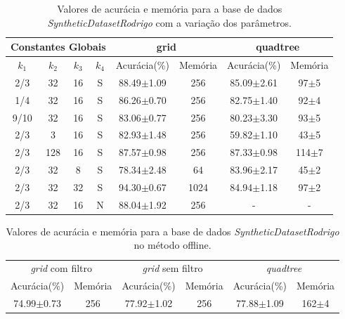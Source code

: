 \documentclass[conference]{IEEEtran}
\begin{document}
\begin{table}[h]
\caption{Valores de acurácia e memória para a base de dados \textit{SyntheticDatasetRodrigo} com a variação dos parâmetros.}
\tabcolsep=0.12cm
\begin{center}
\begin{tabular}{@{}cccccccc@{}}
\hline
\multicolumn{4}{c}{Constantes Globais} & \multicolumn{2}{c}{grid} & \multicolumn{2}{c}{quadtree} \\ \hline
$k_{1}$ & $k_{2}$ & $k_{3}$ & $k_{4}$ & Acurácia(\%) & Memória & Acurácia(\%) & Memória \\ \hline
2/3 & 32 & 16 & S & 88.49$\pm$1.09 & 256 & 85.09$\pm$2.61 & 97$\pm$5 \\
1/4 & 32 & 16 & S & 86.26$\pm$0.70 & 256 & 82.75$\pm$1.40 & 92$\pm$4 \\
9/10 & 32 & 16 & S & 83.06$\pm$0.77 & 256 & 80.23$\pm$3.30 & 93$\pm$5 \\
2/3 & 3 & 16 & S & 82.93$\pm$1.48 & 256 & 59.82$\pm$1.10 & 43$\pm$5 \\
2/3 & 128 & 16 & S & 87.57$\pm$0.98 & 256 & 87.33$\pm$0.98 & 114$\pm$7 \\
2/3 & 32 & 8 & S & 78.34$\pm$2.48 & 64 & 83.96$\pm$2.17 & 45$\pm$2 \\
2/3 & 32 & 32 & S & 94.30$\pm$0.67 & 1024 & 84.94$\pm$1.18 & 97$\pm$2 \\
2/3 & 32 & 16 & N & 88.04$\pm$1.92 & 256 & - & - \\ \hline
\end{tabular}
\label{tabon}
\end{center}
\end{table}

\begin{table}[h]
\caption{Valores de acurácia e memória para a base de dados \textit{SyntheticDatasetRodrigo} no método offline.}
\tabcolsep=0.1cm
\begin{center}
\begin{tabular}{@{}cccccc@{}}
\hline
\multicolumn{2}{c}{\textit{grid} com filtro} & \multicolumn{2}{c}{\textit{grid} sem filtro} & \multicolumn{2}{c}{\textit{quadtree}} \\
Acurácia(\%) & Memória & Acurácia(\%) & Memória & Acurácia(\%) & Memória \\ \hline
74.99$\pm$0.73 & 256 & 77.92$\pm$1.02 & 256 & 77.88$\pm$1.09 & 162$\pm$4 \\ \hline
\end{tabular}
\label{taboff}
\end{center}
\end{table}
\end{document}
